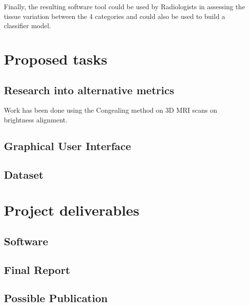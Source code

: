 \documentclass[11pt,fleqn,twoside]{article}
\begin{document}
Finally, the resulting software tool could be used by Radiologists in assessing the tissue variation between the 4 categories and could also be used to build a classifier model.

\section{Proposed tasks}

\subsection{Research into alternative metrics}
Work has been done using the Congealing method on 3D MRI scans on brightness alignment.

\subsection{Graphical User Interface}

\subsection{Dataset}

\section{Project deliverables}

\subsection{Software}

\subsection{Final Report}

\subsection{Possible Publication}


\nocite{*} %
\end{document}
